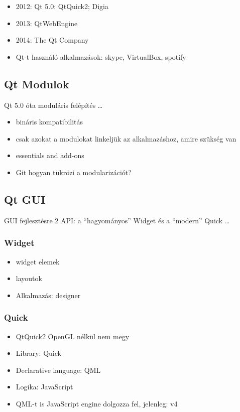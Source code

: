 \documentclass[12pt]{report}
\begin{document}
\begin{itemize}
    \item 2012: Qt 5.0: QtQuick2; Digia
    \item 2013: QtWebEngine
    \item 2014: The Qt Company
    \item Qt-t használó alkalmazások: skype, VirtualBox, spotify
\end{itemize}

\subsection{Qt Modulok}
Qt 5.0 óta moduláris felépítés \dots
\begin{itemize}
    \item bináris kompatibilitás
    \item csak azokat a modulokat linkeljük az alkalmazáshoz, amire szükség van
    \item essentials and add-ons
    \item Git hogyan tükrözi a modularizációt?
\end{itemize}

\subsection{Qt GUI}
GUI fejlesztésre 2 API: a ``hagyományos'' Widget és a ``modern'' Quick \dots

\subsubsection{Widget}
\begin{itemize}
    \item widget elemek
    \item layoutok
    \item Alkalmazás: designer
\end{itemize}

\subsubsection{Quick}
\begin{itemize}
    \item QtQuick2 OpenGL nélkül nem megy
    \item Library: Quick
    \item Declarative language: QML
    \item Logika: JavaScript
    \item QML-t is JavaScript engine dolgozza fel, jelenleg: v4
\end{itemize}
\end{document}
